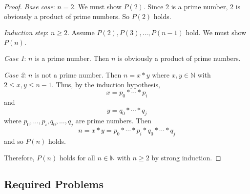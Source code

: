 \documentclass[11pt,fleqn]{article}
\begin{document}
\begin{enumerate}
\begin{proof}
\emph{Base case}: $n = 2$.  We must show $P(2)$.  Since 2 is a prime
number, 2 is obviously a product of prime numbers.  So $P(2)$ holds.

\medskip

\emph{Induction step}: $n \ge 2$.  Assume $P(2), P(3), \ldots, P(n-1)$
hold.  We must show $P(n)$.

\emph{Case 1}: $n$ is a prime number.  Then $n$ is obviously a product
of prime numbers.

\emph{Case 2}: $n$ is not a prime number.  Then $n = x * y$ where $x,y
\in \mathbb{N}$ with $2 \le x,y \le n - 1$.  Thus, by the induction
hypothesis, \[x = p_0 * \cdots *p_i\] and \[y = q_0 * \cdots *q_j\]
where $p_0,\ldots,p_i,q_0,\ldots,q_j$ are prime numbers.  Then \[n = x
* y = p_0 * \cdots * p_i * q_0 * \cdots * q_j\] and so $P(n)$ holds.

\medskip

Therefore, $P(n)$ holds for all $n \in \mathbb{N}$ with $n \ge 2$ by
strong induction.
\end{proof}

\end{enumerate}

\subsection*{Required Problems}
\end{document}

